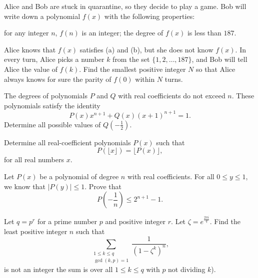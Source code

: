 \documentclass[12pt,a4paper]{memoir}
\theoremstyle{definition}
\begin{document}
\begin{question}[name={2020 Taiwan TST}]
	Alice and Bob are stuck in quarantine, so they decide to play a game. Bob will write down a polynomial $f(x)$ with the following properties:
	\begin{tasks}
		\task for any integer $n$, $f(n)$ is an integer;
		\task the degree of $f(x)$ is less than $187$.
	\end{tasks}
	Alice knows that $f(x)$ satisfies (a) and (b), but she does not know $f(x)$. In every turn, Alice picks a number $k$ from the set $\{1,2,\ldots,187\}$, and Bob will tell Alice the value of $f(k)$. Find the smallest positive integer $N$ so that Alice always knows for sure the parity of $f(0)$ within $N$ turns.
\end{question}


\begin{question}[name={2020 Tuymaada}]
	The degrees of polynomials $P$ and $Q$ with real coefficients do not exceed $n$. These polynomials satisfy the identity \[ P(x) x^{n + 1} + Q(x) (x+1)^{n + 1} = 1.\] Determine all possible values of $Q \left( - \frac{1}{2} \right)$.
\end{question}


\begin{question}[name={2020 Indonesia}]
	Determine all real-coefficient polynomials $P(x)$ such that
	\[ P(\lfloor x \rfloor) = \lfloor P(x) \rfloor,\] for all real numbers $x$.
\end{question}


\begin{question}[name={2019 Latvian TST for Balkan}]
	Let $P(x)$ be a polynomial of degree $n$ with real coefficients. For all $0 \leq y \leq 1$, we know that $|P(y)| \leq 1$. Prove that \[P\left(-\frac{1}{n}\right) \leq 2^{n+1} -1.\]
\end{question}


\begin{question}[name={2021 USA TSTST}]
	Let $q=p^r$ for a prime number $p$ and positive integer $r$. Let $\zeta = e^{\frac{2\pi i}{q}}$. Find the least positive integer $n$ such that \[\sum_{\substack{1\leq k\leq q\\ \gcd(k,p)=1}} \frac{1}{(1-\zeta^k)^n},\] is not an integer the sum is over all $1\leq k\leq q$ with $p$ not dividing $k$).
\end{question}
\end{document}
